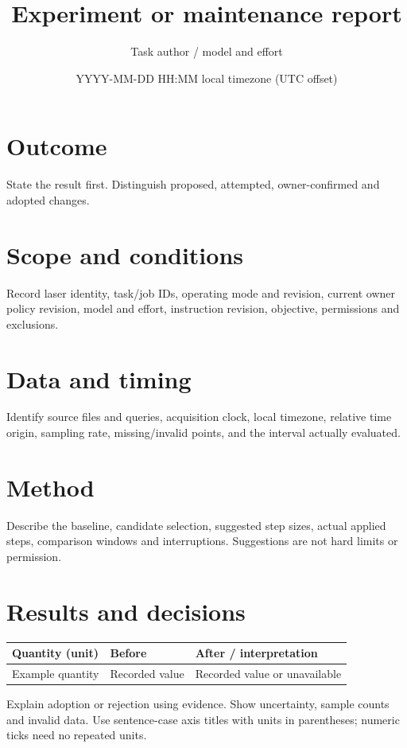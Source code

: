 \documentclass{ldconreport}
\title{Experiment or maintenance report}
\author{Task author / model and effort}
\date{YYYY-MM-DD HH:MM local timezone (UTC offset)}
\begin{document}
\maketitle
{}
\section{Outcome}
State the result first. Distinguish proposed, attempted, owner-confirmed and adopted changes.
\section{Scope and conditions}
Record laser identity, task/job IDs, operating mode and revision, current owner policy revision,
model and effort, instruction revision, objective, permissions and exclusions.
\section{Data and timing}
Identify source files and queries, acquisition clock, local timezone, relative time origin,
sampling rate, missing/invalid points, and the interval actually evaluated.
\section{Method}
Describe the baseline, candidate selection, suggested step sizes, actual applied steps,
comparison windows and interruptions. Suggestions are not hard limits or permission.
\section{Results and decisions}
\begin{tabularx}{\linewidth}{@{}lXX@{}}
\toprule
Quantity (unit) & Before & After / interpretation \\
\midrule
Example quantity & Recorded value & Recorded value or unavailable \\
\bottomrule
\end{tabularx}
Explain adoption or rejection using evidence. Show uncertainty, sample counts and invalid data.
Use sentence-case axis titles with units in parentheses; numeric ticks need no repeated units.
\end{document}

